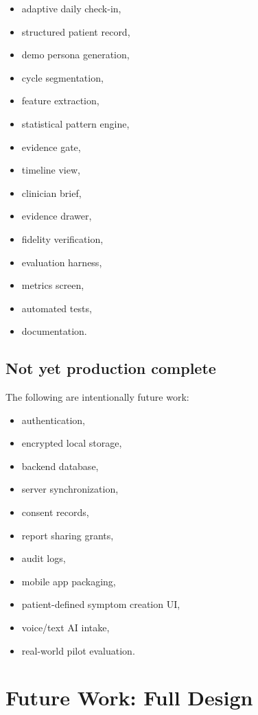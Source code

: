 \documentclass[11pt,a4paper]{article}
\begin{document}
\begin{itemize}
  \item adaptive daily check-in,
  \item structured patient record,
  \item demo persona generation,
  \item cycle segmentation,
  \item feature extraction,
  \item statistical pattern engine,
  \item evidence gate,
  \item timeline view,
  \item clinician brief,
  \item evidence drawer,
  \item fidelity verification,
  \item evaluation harness,
  \item metrics screen,
  \item automated tests,
  \item documentation.
\end{itemize}

\subsection{Not yet production complete}

The following are intentionally future work:

\begin{itemize}
  \item authentication,
  \item encrypted local storage,
  \item backend database,
  \item server synchronization,
  \item consent records,
  \item report sharing grants,
  \item audit logs,
  \item mobile app packaging,
  \item patient-defined symptom creation UI,
  \item voice/text AI intake,
  \item real-world pilot evaluation.
\end{itemize}

\section{Future Work: Full Design}
\end{document}
